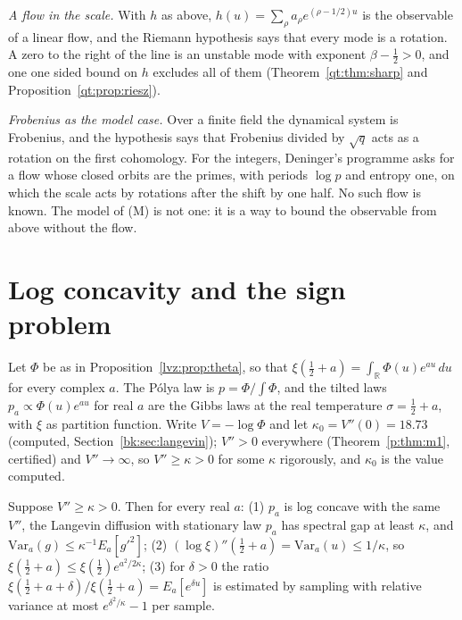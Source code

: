 \emph{A flow in the scale.} With $h$ as above, $h(u)=\sum_\rho a_\rho e^{(\rho-1/2)u}$ is the observable of a linear flow, and the Riemann hypothesis says that every mode is a rotation. A zero to the right of the line is an unstable mode with exponent $\beta-\frac12>0$, and one one sided bound on $h$ excludes all of them (Theorem~\ref{qt:thm:sharp} and Proposition~\ref{qt:prop:riesz}).

\emph{Frobenius as the model case.} Over a finite field the dynamical system is Frobenius, and the hypothesis says that Frobenius divided by $\sqrt q$ acts as a rotation on the first cohomology. For the integers, Deninger's programme \cite{Deninger92} asks for a flow whose closed orbits are the primes, with periods $\log p$ and entropy one, on which the scale acts by rotations after the shift by one half. No such flow is known. The model of (M) is not one: it is a way to bound the observable from above without the flow.


\section{Log concavity and the sign problem}\label{lvz:sec:logc}

Let $\Phi$ be as in Proposition~\ref{lvz:prop:theta}, so that $\xi(\frac12+a)=\int_{\mathbb R}\Phi(u)e^{au}\,du$ for every complex $a$. The P\'olya law is $p=\Phi/\!\int\Phi$, and the tilted laws $p_a\propto\Phi(u)e^{au}$ for real $a$ are the Gibbs laws at the real temperature $\sigma=\frac12+a$, with $\xi$ as partition function. Write $V=-\log\Phi$ and let $\kappa_0=V''(0)=18.73$ (computed, Section~\ref{bk:sec:langevin}); $V''>0$ everywhere (Theorem~\ref{p:thm:m1}, certified) and $V''\to\infty$, so $V''\ge\kappa>0$ for some $\kappa$ rigorously, and $\kappa_0$ is the value computed.

\begin{proposition}\label{lvz:prop:logconcave}
Suppose $V''\ge\kappa>0$. Then for every real $a$: (1) $p_a$ is log concave with the same $V''$, the Langevin diffusion with stationary law $p_a$ has spectral gap at least $\kappa$, and $\mathrm{Var}_a(g)\le\kappa^{-1}E_a[g'^2]$; (2) $(\log\xi)''(\frac12+a)=\mathrm{Var}_a(u)\le1/\kappa$, so $\xi(\frac12+a)\le\xi(\frac12)e^{a^2/2\kappa}$; (3) for $\delta>0$ the ratio $\xi(\frac12+a+\delta)/\xi(\frac12+a)=E_a[e^{\delta u}]$ is estimated by sampling with relative variance at most $e^{\delta^2/\kappa}-1$ per sample.
\end{proposition}

